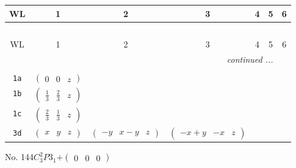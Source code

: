 \documentclass[fleqn,9pt,landscape]{jsarticle}
\begin{document}
\begin{center}
\renewcommand{\arraystretch}{1.2}
\begin{longtable}{ccccccc}
 \hline \hline
WL & 1 & 2 & 3 & 4 & 5 & 6 \\ \hline \endfirsthead

\multicolumn{6}{l}{\tablename\ \thetable{}} \\
 \hline \hline
WL & 1 & 2 & 3 & 4 & 5 & 6 \\ \hline \endhead

 \hline \hline
\multicolumn{6}{r}{\footnotesize\it continued ...} \\ \endfoot

 \hline \hline
\multicolumn{6}{r}{} \\ \endlastfoot

{\tt 1a} & $ \begin{pmatrix} 0 & 0 & z \end{pmatrix} $ & $  $ & $  $ \\ \hline
{\tt 1b} & $ \begin{pmatrix} \frac{1}{3} & \frac{2}{3} & z \end{pmatrix} $ & $  $ & $  $ \\ \hline
{\tt 1c} & $ \begin{pmatrix} \frac{2}{3} & \frac{1}{3} & z \end{pmatrix} $ & $  $ & $  $ \\ \hline
{\tt 3d} & $ \begin{pmatrix} x & y & z \end{pmatrix} $ & $ \begin{pmatrix} - y & x - y & z \end{pmatrix} $ & $ \begin{pmatrix} - x + y & - x & z \end{pmatrix} $ \\
\end{longtable}
\end{center}
\newpage
No. 144\quad$C_{3}^{2}$\quad$P3_1$\quad[ trigonal ]\quad$+\begin{pmatrix} 0 & 0 & 0 \end{pmatrix}$
\end{document}
